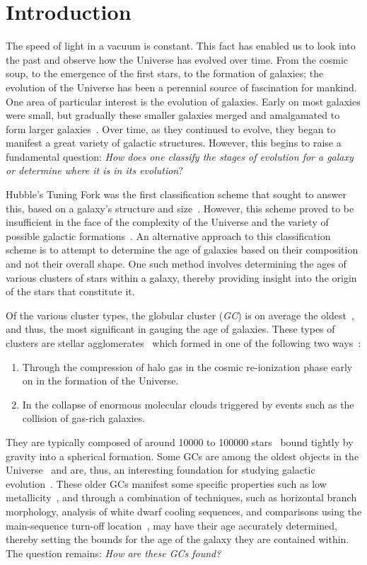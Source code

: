 \chapter{Introduction}
\setcounter{page}{1}

The speed of light in a vacuum is constant. This fact has enabled us to look
into the past and observe how the Universe has evolved over time. From the cosmic soup, to the emergence of the first stars, to the formation of galaxies; the evolution of the Universe has been a perennial source of fascination for mankind. One area of particular interest is the evolution of galaxies. Early on most galaxies were small, but gradually these smaller galaxies merged and amalgamated to form larger galaxies~\cite{mergingGalaxies}. Over time, as they continued to evolve, they began to manifest a great variety of galactic structures. However, this begins to raise a fundamental question: \textit{How does one classify the stages of evolution for a galaxy or determine where it is in its evolution}?

Hubble's Tuning Fork was the first classification scheme that sought to answer this, based on a galaxy's structure and size~\cite{hubblesTuningFork}. However, this scheme proved to be insufficient in the face of the complexity of the Universe and the variety of possible galactic formations~\cite{hubblesTuningFork}. An alternative approach to this classification scheme is to attempt to determine the age of galaxies based on their composition and not their overall shape. One such method involves determining the ages of various clusters of stars within a galaxy, thereby providing insight into the origin of the stars that constitute it.

Of the various cluster types, the globular cluster (\textit{GC}) is on average
the oldest~\cite{Jimenez1996}, and thus, the most significant in gauging the
age of galaxies. These types of clusters are stellar agglomerates~\cite{Gratton}
which formed in one of the following two ways~\cite{globular-cluster-formation}:
\begin{enumerate}
    \item Through the compression of halo gas in the cosmic re-ionization phase early on in the formation of the Universe.
    \item In the collapse of enormous molecular clouds triggered by events such as the collision of gas-rich galaxies.
\end{enumerate}
They are typically composed of around \num{10000} to \num{100000}
stars~\cite{sizeGC} bound tightly by gravity into a spherical formation. Some GCs are among the oldest objects in the Universe~\cite{OMalley2017} and are, thus, an interesting foundation for studying galactic evolution~\cite{Mohammadi}. These older GCs manifest some specific properties such as low metallicity~\cite{Dotter2011},
and through a combination of techniques, such as horizontal branch morphology, analysis of white dwarf cooling sequences, and comparisons using the main-sequence turn-off location~\cite{OMalley2017, Soderblom2010}, may have their age accurately determined, thereby setting the bounds for the age of the galaxy they are contained within. The question remains: \textit{How are these GCs found?}

